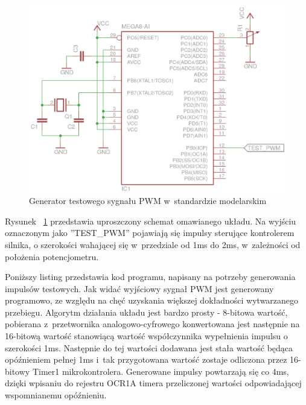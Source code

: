 \documentclass[11pt, twoside]{Thesis} %
\begin{document}
\begin{figure}[H]
	\centering
	\includegraphics[scale=1]{Pictures/TestSignalGenerator.png}
	\caption[Generator testowego sygnału PWM w~standardzie modelarskim]{Generator testowego sygnału PWM w~standardzie modelarskim}
	\label{fig:TestSignalGenerator_sch}
\end{figure}

Rysunek ~\ref{fig:TestSignalGenerator_sch} przedstawia uproszczony schemat omawianego układu. Na wyjściu oznaczonym jako ''TEST\_PWM'' pojawiają się impulsy sterujące kontrolerem silnika, o szerokości wahającej się w~przedziale od 1ms do 2ms, w~zależności od położenia potencjometru.

Poniższy listing przedstawia kod programu, napisany na potrzeby generowania impulsów testowych. Jak widać wyjściowy sygnał PWM jest generowany programowo, ze względu na chęć uzyskania większej dokładności wytwarzanego przebiegu. Algorytm działania układu jest bardzo prosty - 8-bitowa wartość, pobierana z~przetwornika analogowo-cyfrowego konwertowana jest następnie na 16-bitową wartość stanowiącą wartość współczynnika wypełnienia impulsu o szerokości 1ms. Następnie do tej wartości dodawana jest stała wartość będąca opóźnieniem pełnej 1ms i~tak przygotowana wartość zostaje odliczona przez 16-bitowy Timer1 mikrokontrolera. Generowane impulsy powtarzają się co 4ms, dzięki wpisaniu do rejestru OCR1A timera przeliczonej wartości odpowiadającej wspomnianemu opóźnieniu.
\end{document}
